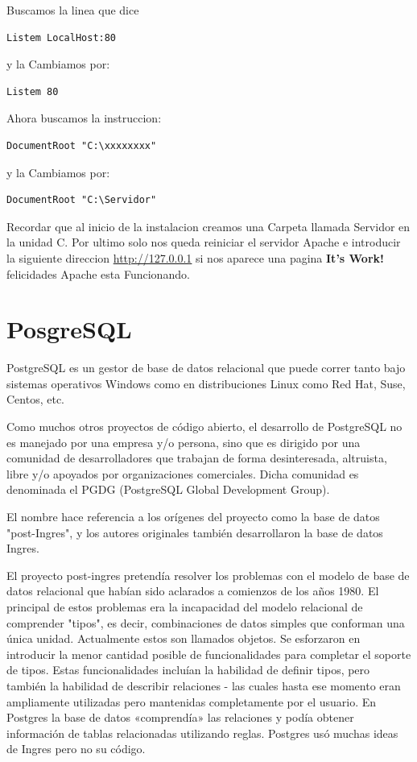 Buscamos la linea que dice

\begin{lstlisting}[style=consola, numbers=none]
    Listem LocalHost:80
\end{lstlisting}

y la Cambiamos por:

\begin{lstlisting}[style=consola, numbers=none]
    Listem 80
\end{lstlisting}

Ahora buscamos la instruccion:

\begin{lstlisting}[style=consola, numbers=none]
    DocumentRoot "C:\xxxxxxxx"
\end{lstlisting}

y la Cambiamos por:

\begin{lstlisting}[style=consola, numbers=none]
    DocumentRoot "C:\Servidor"
\end{lstlisting}

Recordar que al inicio de la instalacion creamos una Carpeta llamada Servidor en
la unidad C. Por ultimo solo nos queda reiniciar el servidor Apache e introducir
la siguiente direccion \url{http://127.0.0.1} si nos aparece una pagina
{\bfseries It's Work!} felicidades Apache esta Funcionando.


\section{PosgreSQL}

PostgreSQL es un gestor de base de datos relacional que puede correr tanto bajo
sistemas operativos Windows como en distribuciones Linux como Red Hat, Suse,
Centos, etc.

Como muchos otros proyectos de código abierto, el desarrollo de PostgreSQL
no es manejado por una empresa y/o persona, sino que es dirigido por una comunidad
de desarrolladores que trabajan de forma desinteresada, altruista, libre y/o
apoyados por organizaciones comerciales. Dicha comunidad es denominada
el PGDG (PostgreSQL Global Development Group).

El nombre hace referencia a los orígenes del proyecto como la base de datos
"post-Ingres", y los autores originales también desarrollaron la base de datos Ingres.

El proyecto post-ingres pretendía resolver los problemas con el modelo de base
de datos relacional que habían sido aclarados a comienzos de los años 1980. El
principal de estos problemas era la incapacidad del modelo relacional de
comprender "tipos", es decir, combinaciones de datos simples que conforman una
única unidad. Actualmente estos son llamados objetos. Se esforzaron en introducir
la menor cantidad posible de funcionalidades para completar el soporte de tipos.
Estas funcionalidades incluían la habilidad de definir tipos, pero también
la habilidad de describir relaciones - las cuales hasta ese momento eran
ampliamente utilizadas pero mantenidas completamente por el usuario. En Postgres
la base de datos «comprendía» las relaciones y podía obtener información de
tablas relacionadas utilizando reglas. Postgres usó muchas ideas de Ingres
pero no su código.

